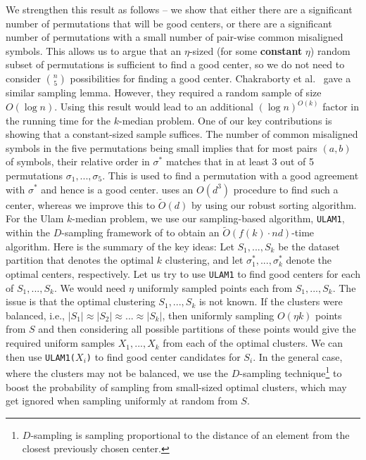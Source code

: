 \documentclass[11pt]{llncs}
\begin{document}
We strengthen this result as follows -- we show that either there are a significant number of permutations that will be good centers, or there are a significant number of permutations with a small number of pair-wise common misaligned symbols.
This allows us to argue that an $\eta$-sized (for some {\bf constant} $\eta$) random subset of permutations is sufficient to find a good center, so we do not need to consider $\binom{n}{5}$ possibilities for finding a good center. Chakraborty et al.~\cite{cdk23} gave a similar sampling lemma. However, they required a random sample of size $O(\log n)$. Using this result would lead to an additional $(\log{n})^{O(k)}$ factor in the running time for the $k$-median problem. 
One of our key contributions is showing that a constant-sized sample suffices. 
The number of common misaligned symbols in the five permutations being small implies that for most pairs $(a, b)$ of symbols, their relative order in $\sigma^*$ matches that in at least 3 out of 5 permutations $\sigma_1, ..., \sigma_5$. This is used to find a permutation with a good agreement with $\sigma^*$ and hence is a good center. \cite{cdk23} uses an $O(d^3)$ procedure to find such a center, whereas we improve this to $\tilde{O}(d)$ by using our robust sorting algorithm. For the Ulam $k$-median problem, we use our sampling-based algorithm, {\tt ULAM1}, within the $D$-sampling framework of \cite{jks} to obtain an $\tilde{O}(f(k) \cdot nd)$-time algorithm. Here is the summary of the key ideas: Let $S_1, ..., S_k$ be the dataset partition that denotes the optimal $k$ clustering, and let $\sigma^*_1, ..., \sigma^*_k$ denote the optimal centers, respectively. Let us try to use {\tt ULAM1} to find good centers for each of $S_1, ..., S_k$. We would need $\eta$ uniformly sampled points each from $S_1, ..., S_k$. 
The issue is that the optimal clustering $S_1, ..., S_k$ is not known.
If the clusters were balanced, i.e., $|S_1| \approx |S_2| \approx ... \approx |S_k|$, then uniformly sampling $O(\eta k)$ points from $S$ and then considering all possible partitions of these points would give the required uniform samples $X_1, ..., X_k$ from each of the optimal clusters. We can then use {\tt ULAM1($X_i$)} to find good center candidates for $S_i$. 
In the general case, where the clusters may not be balanced, we use the $D$-sampling technique\footnote{$D$-sampling is sampling proportional to the distance of an element from the closest previously chosen center.} to boost the probability of sampling from small-sized optimal clusters, which may get ignored when sampling uniformly at random from $S$. 
\end{document}

